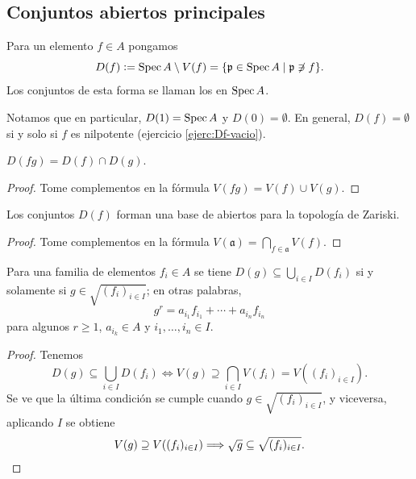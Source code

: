 \documentclass{article}
\numberwithin{equation}{section}
\theoremstyle{definition}
\begin{document}
\subsection{Conjuntos abiertos principales}

\begin{definicion}
  \label{dfn:abiertos-principales}
  Para un elemento $f \in A$ pongamos
  \[ D (f) \mathrel{\mathop:}= \operatorname{Spec} A \setminus V (f) =
    \{ \mathfrak{p} \in \operatorname{Spec} A \mid \mathfrak{p} \not\ni f \}. \]
  Los conjuntos de esta forma se llaman los
   en $\operatorname{Spec} A$.
\end{definicion}

Notamos que en particular, $D (1) = \operatorname{Spec} A$ y $D (0) = \emptyset$. En general,
$D (f) = \emptyset$ si y solo si $f$ es nilpotente (ejercicio
\ref{ejerc:Df-vacio}).

\begin{observacion}
  $D (fg) = D (f) \cap D (g)$.

  \begin{proof}
    Tome complementos en la fórmula $V (fg) = V (f) \cup V (g)$.
  \end{proof}
\end{observacion}

\begin{observacion}
  Los conjuntos $D (f)$ forman una base de abiertos para la topología
  de Zariski.

  \begin{proof}
    Tome complementos en la fórmula
    $V (\mathfrak{a}) = \bigcap_{f \in \mathfrak{a}} V (f)$.
  \end{proof}
\end{observacion}

\begin{lema}
  \label{lema:Df-en-union-de-Dfi}
  Para una familia de elementos $f_i \in A$ se tiene
  $D (g) \subseteq \bigcup_{i\in I} D (f_i)$ si y solamente si
  $g \in \sqrt{(f_i)_{i\in I}}$; en otras palabras,
  $$g^r = a_{i_1} f_{i_1} + \cdots + a_{i_n} f_{i_n}$$
  para algunos $r \ge 1$, $a_{i_k} \in A$ y $i_1,\ldots,i_n \in I$.

  \begin{proof}
    Tenemos
    \[ D (g) \subseteq \bigcup_{i\in I} D (f_i) \iff
      V (g) \supseteq \bigcap_{i\in I} V (f_i) = V ((f_i)_{i\in I}). \]
    Se ve que la última condición se cumple cuando
    $g \in \sqrt{(f_i)_{i\in I}}$, y viceversa, aplicando $I$ se obtiene
    \[ V (g) \supseteq V ((f_i)_{i\in I}) \Longrightarrow
       \sqrt{g} \subseteq \sqrt{(f_i)_{i\in I}}. \qedhere \]
  \end{proof}
\end{lema}
\end{document}
